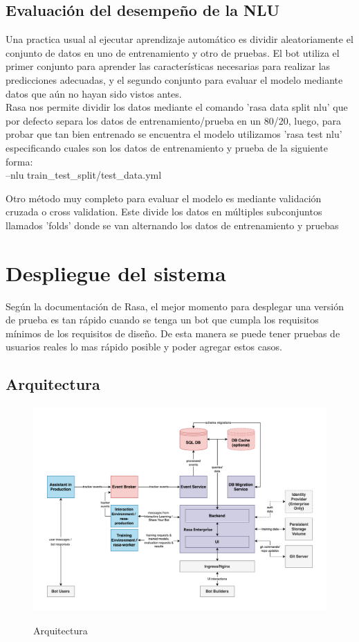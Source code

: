 \subsection{Evaluación del desempeño de la NLU}
Una practica usual al ejecutar aprendizaje automático es dividir aleatoriamente el conjunto de datos en uno de entrenamiento y otro de pruebas. El bot utiliza el primer conjunto para aprender las características necesarias para realizar las predicciones adecuadas, y el segundo conjunto para evaluar el modelo mediante datos que aún no hayan sido vistos antes.\\
Rasa nos permite dividir los datos mediante el comando 'rasa data split nlu' que por defecto separa los datos de entrenamiento/prueba en un 80/20, luego, para probar que tan bien entrenado se encuentra el modelo utilizamos 'rasa test nlu' especificando cuales son los datos de entrenamiento y prueba de la siguiente forma:\\
    --nlu train\_test\_split/test\_data.yml

Otro método muy completo para evaluar el modelo es mediante validación cruzada o cross validation. Este divide los datos en múltiples subconjuntos llamados 'folds' donde se van alternando los datos de entrenamiento y pruebas

\section{Despliegue del sistema}
Según la documentación de Rasa, el mejor momento para desplegar una versión de prueba es tan rápido cuando 
se tenga un bot que cumpla los requisitos mínimos de los requisitos de diseño. De esta manera se puede
tener pruebas de usuarios reales lo mas rápido posible y poder agregar estos casos.

\subsection{Arquitectura}

\begin{figure}[h]
    \centering
    \includegraphics[width=\textwidth]{imagenes/cap3/architecture_deploy.png}   
    \caption{Arquitectura}
    \label{fig:deploy-architecture}
    \cite{Rasa}
\end{figure}


